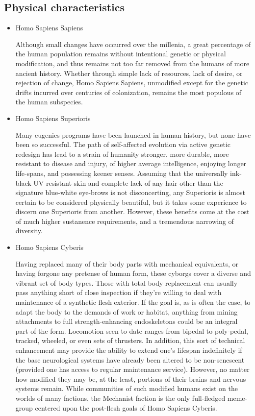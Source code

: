 \subsection{Physical characteristics}
\begin{itemize}
\item Homo Sapiens Sapiens

Although small changes have occurred over the millenia, a great
percentage of the human population remains without intentional genetic
or physical modification, and thus remains not too far removed from
the humans of more ancient history. Whether through simple lack of
resources, lack of desire, or rejection of change, Homo Sapiens
Sapiens, unmodified except for the genetic drifts incurred over
centuries of colonization, remains the most populous of the human
subspecies.

\item Homo Sapiens Superioris

Many eugenics programs have been launched in human history, but none
have been so successful. The path of self-affected evolution via
active genetic redesign has lead to a strain of humanity stronger,
more durable, more resistant to disease and injury, of higher average
intelligence, enjoying longer life-spans, and possessing keener
senses.  Assuming that the universally ink-black UV-resistant skin and
complete lack of any hair other than the signature blue-white
eye-brows is not disconcerting, any Superioris is almost certain to be
considered physically beautiful, but it takes some experience to
discern one Superioris from another. However, these benefits come at
the cost of much higher sustanence requirements, and a tremendous
narrowing of diversity.

\item Homo Sapiens Cyberis

Having replaced many of their body parts with mechanical equivalents,
or having forgone any pretense of human form, these cyborgs cover a
diverse and vibrant set of body types. Those with total body
replacement can usually pass anything short of close inspection if
they're willing to deal with maintenance of a synthetic flesh
exterior. If the goal is, as is often the case, to adapt the body to
the demands of work or habitat, anything from mining attachments to
full strength-enhancing endoskeletons could be an integral part of the
form. Locomotion seen to date ranges from bipedal to poly-pedal,
tracked, wheeled, or even sets of thrusters. In addition, this sort of
technical enhancement may provide the ability to extend one's lifespan
indefinitely if the base neurological systems have already been
altered to be non-senescent (provided one has access to regular
maintenance service). However, no matter how modified they may be, at
the least, portions of their brains and nervous systems remain.  While
communities of such modified humans exist on the worlds of many
factions, the Mechanist faction is the only full-fledged meme-group
centered upon the post-flesh goals of Homo Sapiens Cyberis.


\end{itemize}
